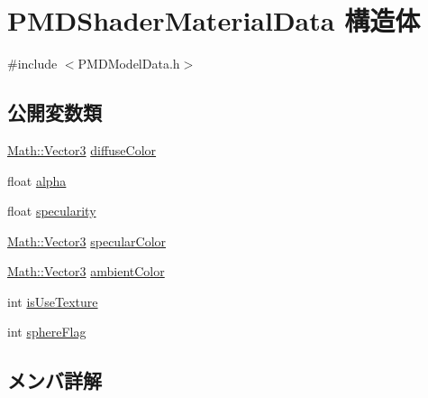 \hypertarget{struct_p_m_d_shader_material_data}{}\section{P\+M\+D\+Shader\+Material\+Data 構造体}
\label{struct_p_m_d_shader_material_data}


{\ttfamily \#include $<$P\+M\+D\+Model\+Data.\+h$>$}

\subsection*{公開変数類}
\begin{DoxyCompactItemize}
\item 
\mbox{\hyperlink{struct_math_1_1_vector3}{Math\+::\+Vector3}} \mbox{\hyperlink{struct_p_m_d_shader_material_data_aed48b81c7419be094332641735c851c3}{diffuse\+Color}}
\item 
float \mbox{\hyperlink{struct_p_m_d_shader_material_data_a7cecd80aa0d657d983070859f5b2f298}{alpha}}
\item 
float \mbox{\hyperlink{struct_p_m_d_shader_material_data_a8a1f669aaaebb002f9bc8787cc9774d4}{specularity}}
\item 
\mbox{\hyperlink{struct_math_1_1_vector3}{Math\+::\+Vector3}} \mbox{\hyperlink{struct_p_m_d_shader_material_data_a455c3ff915b9c29a608cefa02b641420}{specular\+Color}}
\item 
\mbox{\hyperlink{struct_math_1_1_vector3}{Math\+::\+Vector3}} \mbox{\hyperlink{struct_p_m_d_shader_material_data_adb05d453d38b015e0ec08e7e5565dcce}{ambient\+Color}}
\item 
int \mbox{\hyperlink{struct_p_m_d_shader_material_data_a5ee42a778ab59caea2465f5fd8edac72}{is\+Use\+Texture}}
\item 
int \mbox{\hyperlink{struct_p_m_d_shader_material_data_ad0e85b0bc186b60ca467f37d6fda43d0}{sphere\+Flag}}
\end{DoxyCompactItemize}


\subsection{メンバ詳解}
\mbox{\label{struct_p_m_d_shader_material_data_a7cecd80aa0d657d983070859f5b2f298}} 
